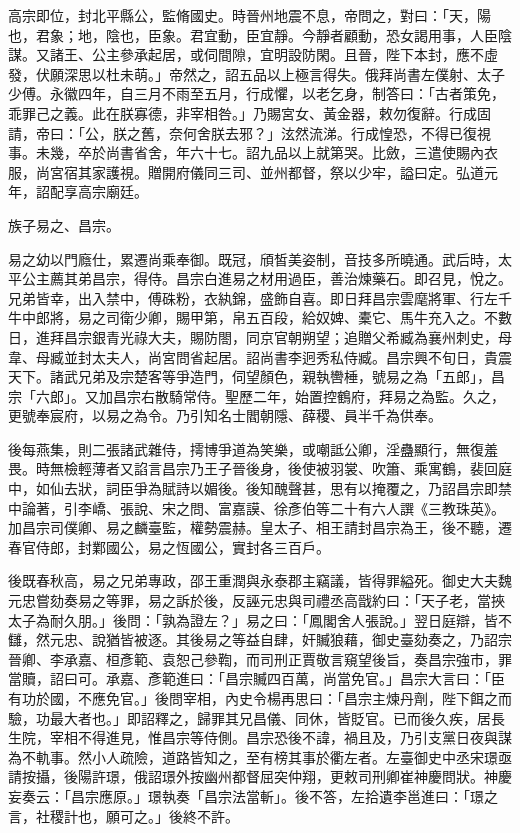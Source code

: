\begin{pinyinscope}
 高宗即位，封北平縣公，監脩國史。時晉州地震不息，帝問之，對曰：「天，陽也，君象；地，陰也，臣象。君宜動，臣宜靜。今靜者顧動，恐女謁用事，人臣陰謀。又諸王、公主參承起居，或伺間隙，宜明設防閑。且晉，陛下本封，應不虛發，伏願深思以杜未萌。」帝然之，詔五品以上極言得失。俄拜尚書左僕射、太子少傅。永徽四年，自三月不雨至五月，行成懼，以老乞身，制答曰：「古者策免，乖罪己之義。此在朕寡德，非宰相咎。」乃賜宮女、黃金器，敕勿復辭。行成固請，帝曰：「公，朕之舊，奈何舍朕去邪？」泫然流涕。行成惶恐，不得已復視事。未幾，卒於尚書省舍，年六十七。詔九品以上就第哭。比斂，三遣使賜內衣服，尚宮宿其家護視。贈開府儀同三司、並州都督，祭以少牢，謚曰定。弘道元年，詔配享高宗廟廷。



 族子易之、昌宗。



 易之幼以門廕仕，累遷尚乘奉御。既冠，頎皙美姿制，音技多所曉通。武后時，太平公主薦其弟昌宗，得侍。昌宗白進易之材用過臣，善治煉藥石。即召見，悅之。兄弟皆幸，出入禁中，傅硃粉，衣紈錦，盛飾自喜。即日拜昌宗雲麾將軍、行左千牛中郎將，易之司衛少卿，賜甲第，帛五百段，給奴婢、橐它、馬牛充入之。不數日，進拜昌宗銀青光祿大夫，賜防閤，同京官朝朔望；追贈父希臧為襄州刺史，母韋、母臧並封太夫人，尚宮問省起居。詔尚書李迥秀私侍臧。昌宗興不旬日，貴震天下。諸武兄弟及宗楚客等爭造門，伺望顏色，親執轡棰，號易之為「五郎」，昌宗「六郎」。又加昌宗右散騎常侍。聖歷二年，始置控鶴府，拜易之為監。久之，更號奉宸府，以易之為令。乃引知名士閻朝隱、薛稷、員半千為供奉。



 後每燕集，則二張諸武雜侍，摴博爭道為笑樂，或嘲詆公卿，淫蠱顯行，無復羞畏。時無檢輕薄者又諂言昌宗乃王子晉後身，後使被羽裳、吹簫、乘寓鶴，裴回庭中，如仙去狀，詞臣爭為賦詩以媚後。後知醜聲甚，思有以掩覆之，乃詔昌宗即禁中論著，引李嶠、張說、宋之問、富嘉謨、徐彥伯等二十有六人譔《三教珠英》。加昌宗司僕卿、易之麟臺監，權勢震赫。皇太子、相王請封昌宗為王，後不聽，遷春官侍郎，封鄴國公，易之恆國公，實封各三百戶。



 後既春秋高，易之兄弟專政，邵王重潤與永泰郡主竊議，皆得罪縊死。御史大夫魏元忠嘗劾奏易之等罪，易之訴於後，反誣元忠與司禮丞高戩約曰：「天子老，當挾太子為耐久朋。」後問：「孰為證左？」易之曰：「鳳閣舍人張說。」翌日庭辯，皆不讎，然元忠、說猶皆被逐。其後易之等益自肆，奸贓狼藉，御史臺劾奏之，乃詔宗晉卿、李承嘉、桓彥範、袁恕己參鞫，而司刑正賈敬言窺望後旨，奏昌宗強市，罪當贖，詔曰可。承嘉、彥範進曰：「昌宗贓四百萬，尚當免官。」昌宗大言曰：「臣有功於國，不應免官。」後問宰相，內史令楊再思曰：「昌宗主煉丹劑，陛下餌之而驗，功最大者也。」即詔釋之，歸罪其兄昌儀、同休，皆貶官。已而後久疾，居長生院，宰相不得進見，惟昌宗等侍側。昌宗恐後不諱，禍且及，乃引支黨日夜與謀為不軌事。然小人疏險，道路皆知之，至有榜其事於衢左者。左臺御史中丞宋璟亟請按攝，後陽許璟，俄詔璟外按幽州都督屈突仲翔，更敕司刑卿崔神慶問狀。神慶妄奏云：「昌宗應原。」璟執奏「昌宗法當斬」。後不答，左拾遺李邕進曰：「璟之言，社稷計也，願可之。」後終不許。




\end{pinyinscope}
